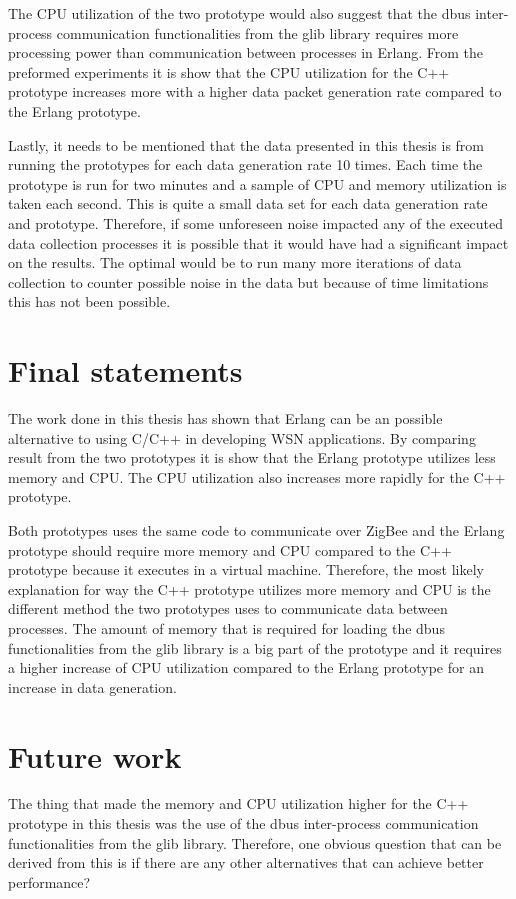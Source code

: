 The CPU utilization of the two prototype would also suggest that the dbus inter-process communication functionalities from the glib library requires more processing power than communication between processes in Erlang. From the preformed experiments it is show that the CPU utilization for the C++ prototype increases more with a higher data packet generation rate compared to the Erlang prototype.  

Lastly, it needs to be mentioned that the data presented in this thesis is from running the prototypes for each data generation rate 10 times. Each time the prototype is run for two minutes and a sample of CPU and memory utilization is taken each second. This is quite a small data set for each data generation rate and prototype. Therefore, if some unforeseen noise impacted any of the executed data collection processes it is possible that it would have had a significant impact on the results. The optimal would be to run many more iterations of data collection to counter possible noise in the data but because of time limitations this has not been possible.     

\section{Final statements}
The work done in this thesis has shown that Erlang can be an possible alternative to using C/C++ in developing WSN applications. By comparing result from the two prototypes it is show that the Erlang prototype utilizes less memory and CPU. The CPU utilization also increases more rapidly for the C++ prototype. 

Both prototypes uses the same code to communicate over ZigBee and the Erlang prototype should require more memory and CPU compared to the C++ prototype because it executes in a virtual machine. Therefore, the most likely explanation for way the C++ prototype utilizes more memory and CPU is the different method the two prototypes uses to communicate data between processes. The amount of memory that is required for loading the dbus functionalities from the glib library is a big part of the prototype and it requires a higher increase of CPU utilization compared to the Erlang prototype for an increase in data generation.    

\section{Future work}
The thing that made the memory and CPU utilization higher for the C++ prototype in this thesis was the use of the dbus inter-process communication functionalities from the glib library. Therefore, one obvious question that can be derived from this is if there are any other alternatives that can achieve better performance? 


